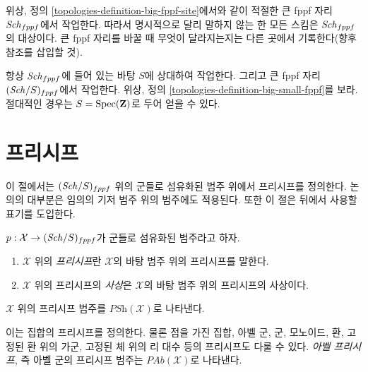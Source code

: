 \medskip\noindent
위상, 정의 \ref{topologies-definition-big-fppf-site}에서와 같이
적절한 큰 fppf 자리 $\mathit{Sch}_{fppf}$에서 작업한다. 따라서 명시적으로
달리 말하지 않는 한 모든 스킴은 $\mathit{Sch}_{fppf}$의 대상이다. 큰 fppf
자리를 바꿀 때 무엇이 달라지는지는 다른 곳에서 기록한다(향후
참조를 삽입할 것).

\medskip\noindent
항상 $\mathit{Sch}_{fppf}$에 들어 있는 바탕 $S$에 상대하여 작업한다.
그리고 큰 fppf 자리 $(\mathit{Sch}/S)_{fppf}$에서 작업한다. 위상, 정의
\ref{topologies-definition-big-small-fppf}를 보라.
절대적인 경우는 $S = \mathop{\mathrm{Spec}}(\mathbf{Z})$로 두어 얻을 수 있다.





\section{프리시프}
\label{section-presheaves}

\noindent
이 절에서는 $(\mathit{Sch}/S)_{fppf}$ 위의 군들로 섬유화된 범주 위에서 프리시프를 정의한다.
논의의 대부분은 임의의 기저 범주 위의 범주에도 적용된다.
또한 이 절은 뒤에서 사용할 표기를 도입한다.

\begin{definition}
\label{definition-presheaves}
$p : \mathcal{X} \to (\mathit{Sch}/S)_{fppf}$가 군들로 섬유화된 범주라고 하자.
\begin{enumerate}
\item $\mathcal{X}$ 위의 {\it 프리시프}란 $\mathcal{X}$의 바탕 범주 위의 프리시프를 말한다.
\item $\mathcal{X}$ 위의 프리시프의 {\it 사상}은 $\mathcal{X}$의 바탕 범주 위의 프리시프의 사상이다.
\end{enumerate}
$\mathcal{X}$ 위의 프리시프 범주를 $\textit{PSh}(\mathcal{X})$로 나타낸다.
\end{definition}

\noindent
이는 집합의 프리시프를 정의한다. 물론 점을 가진 집합, 아벨 군, 군, 모노이드, 환,
고정된 환 위의 가군, 고정된 체 위의 리 대수 등의 프리시프도 다룰 수 있다.
{\it 아벨 프리시프}, 즉 아벨 군의 프리시프 범주는 $\textit{PAb}(\mathcal{X})$로 나타낸다.

